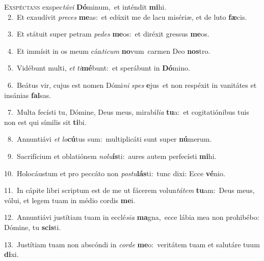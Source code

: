 \lettrine{\initial\textcolor{\initialcolor}{E}}{xspéctans} exspec\-\textit{tá}\-\textit{vi} \textbf{Dó}\-minum,~\star et inténdit \textbf{mi}\-hi.\\
{\numbfont\textcolor{\numbcolor}{~2.}}~Et exaudívit \textit{pre}\-\textit{ces} \textbf{me}\-as:~\star et edúxit me de lacu misériæ, et de luto \textbf{fæ}\-cis.\par
{\numbfont\textcolor{\numbcolor}{~3.}}~Et státuit super petram \textit{pe}\-\textit{des} \textbf{me}\-os:~\star et diréxit gressus \textbf{me}\-os.\par
{\numbfont\textcolor{\numbcolor}{~4.}}~Et immísit in os meum cán\-\textit{ti}\-\textit{cum} \textbf{no}\-vum~\star carmen Deo \textbf{nos}\-tro.\par
{\numbfont\textcolor{\numbcolor}{~5.}}~Vidébunt multi, \textit{et} \textit{ti}\-\textbf{mé}bunt:~\star et sperábunt in \textbf{Dó}\-mino.\par
{\numbfont\textcolor{\numbcolor}{~6.}}~Beátus vir, cujus est nomen Dómi\textit{ni} \textit{spes} \textbf{e}\-jus~\star et non respéxit in vanitátes et insánias \textbf{fal}\-sas.\par
{\numbfont\textcolor{\numbcolor}{~7.}}~Multa fecísti tu, Dómine, Deus meus, mirabí\-\textit{li}\-\textit{a} \textbf{tu}\-a:~\star et cogitatiónibus tuis non est qui símilis sit \textbf{ti}\-bi.\par
{\numbfont\textcolor{\numbcolor}{~8.}}~Annuntiávi \textit{et} \textit{lo}\-\textbf{cú}tus sum:~\star multiplicáti sunt super \textbf{nú}\-merum.\par
{\numbfont\textcolor{\numbcolor}{~9.}}~Sacrifícium et oblatiónem \textit{no}\-\textit{lu}\textbf{ís}ti:~\star aures autem perfecísti \textbf{mi}\-hi.\par
{\numbfont\textcolor{\numbcolor}{10.}}~Holocáustum et pro peccáto non \textit{pos}\-\textit{tu}\textbf{lás}ti:~\star tunc dixi: Ecce \textbf{vé}\-nio.\par
{\numbfont\textcolor{\numbcolor}{11.}}~In cápite libri scriptum est de me ut fácerem volun\-\textit{tá}\-\textit{tem} \textbf{tu}\-am:~\star Deus meus, vólui, et legem tuam in médio cordis \textbf{me}\-i.\par
{\numbfont\textcolor{\numbcolor}{12.}}~Annuntiávi justítiam tuam in ecclé\-\textit{si}\-\textit{a} \textbf{ma}\-gna,~\star ecce lábia mea non prohibébo: Dómine, tu \textbf{scis}\-ti.\par
{\numbfont\textcolor{\numbcolor}{13.}}~Justítiam tuam non abscóndi in \textit{cor}\-\textit{de} \textbf{me}\-o:~\star veritátem tuam et salutáre tuum \textbf{di}\-xi.\par
